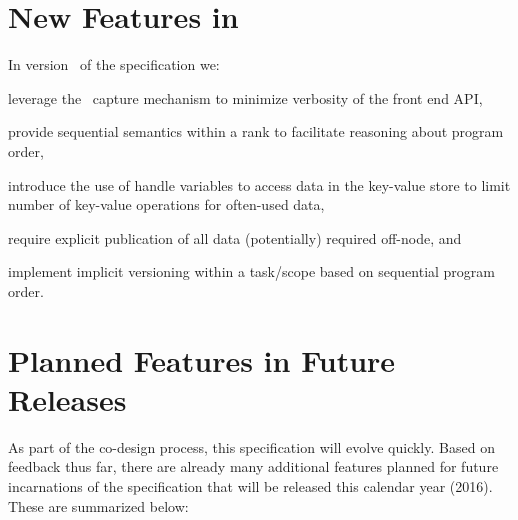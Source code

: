 \section{New Features in \specVersion}
\label{sec:current}
In version \specVersion\ of the specification we:
  \begin{compactenum}
\item leverage the \CC\ \gls{capture} mechanism to minimize verbosity of the \gls{front end}
    \gls{API},
\item provide \gls{sequential semantics} within a \gls{rank} to
    facilitate reasoning about program order,
\item introduce the use of
    \gls{handle} variables to access data in the \gls{key-value store} to limit number of key-value operations for often-used data,
\item require explicit publication of all data (potentially) required off-node, and
\item implement implicit versioning within a task/scope based on sequential program order.
    \end{compactenum}


\section{Planned Features in Future Releases}
\label{sec:future}

As part of the \gls{co-design} process, this specification will evolve quickly.
  Based on feedback thus far, there are already
many additional features planned for future incarnations of the specification that
will be released this calendar year (2016).  These are summarized below:


